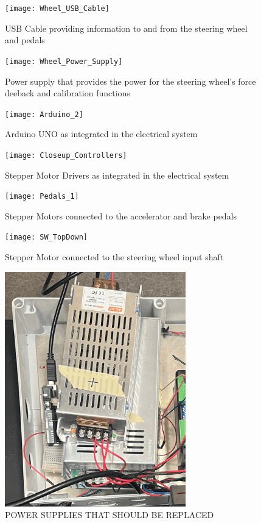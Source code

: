 \documentclass[12pt,oneside,letterpaper]{article}
\begin{document}
\begin{figure}[htb]
\centering
\texttt{[image: Wheel\_USB\_Cable]}
\caption{USB Cable providing information to and from the steering wheel and pedals}
\label{fig:SW_USB}
\end{figure}

\begin{figure}[htb]
\centering
\texttt{[image: Wheel\_Power\_Supply]}
\caption{Power supply that provides the power for the steering wheel's force deeback and calibration functions}
\label{fig:SW_power_brick}
\end{figure}

\begin{figure}[htb]
\centering
\texttt{[image: Arduino\_2]}%
\caption{Arduino UNO as integrated in the electrical system}
\label{fig:Arduino}
\end{figure}

\begin{figure}[htb]
\centering
\texttt{[image: Closeup\_Controllers]}
\caption{Stepper Motor Drivers as integrated in the electrical system}
\label{fig:Stepper_Drivers}
\end{figure}

\begin{figure}[htb]
\centering
\texttt{[image: Pedals\_1]}
\caption{Stepper Motors connected to the accelerator and brake pedals}
\label{fig:pedal_stepper_motors}
\end{figure}

\begin{figure}[htb]
\centering
\texttt{[image: SW\_TopDown]}
\caption{Stepper Motor connected to the steering wheel input shaft}
\label{fig:SW_stepper_motors}
\end{figure}

\begin{figure}[htb]
\centering
\includegraphics[width=0.7\textwidth]{Hardware_Overview}%
\caption{POWER SUPPLIES THAT SHOULD BE REPLACED}
\label{fig:BAD_POWER}
\end{figure}
\end{document}
